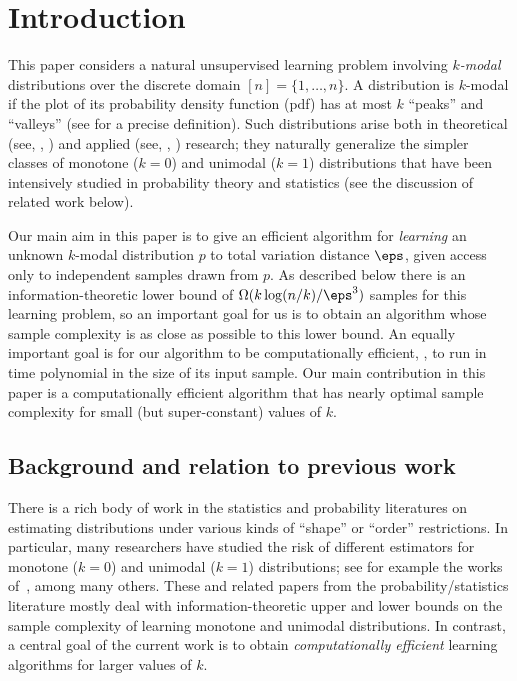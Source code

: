 \section{Introduction} \label{sec:intro}

%

This paper considers a natural unsupervised learning problem involving \emph{$k$-modal} distributions
  over the discrete domain $ {[n]=}\{1,\dots,n\}$. A distribution is
$k$-modal if the plot of its probability density function (pdf) has at most $k$ ``peaks''
and ``valleys'' (see  for a precise definition).  Such distributions arise both in theoretical (see, \eg, \cite{CKC:83,Kemperman:91,ChanTong:04}) and applied (see, \eg, \cite{Murphy:64,ToledoFernandez:90,FPPRD:98}) research; they naturally generalize the simpler classes of monotone ($k=0$) and unimodal ($k=1$) distributions
that have been intensively studied in probability theory and statistics (see the discussion of related work below).

Our main aim in this paper is to give an efficient algorithm for \emph{learning}
an unknown $k$-modal distribution $p$ to total variation distance $\eps$, given access only to independent samples drawn from $p$.  As described below there is an information-theoretic lower bound of
$\Omega(k \log(n/k)/\eps^3)$ samples for this learning problem, so an important goal for us is to
 obtain an algorithm whose sample complexity is as close as possible to this lower bound.  An equally important goal is for our
algorithm to be computationally efficient, \ie, to run in time 
polynomial in the size of its input sample.  
Our main contribution in this paper is a computationally efficient
algorithm that has nearly optimal sample complexity for 
small (but super-constant) values of $k$.


\subsection{Background and  relation to previous work} \label{sec:background}

%

There is a rich body of work in the statistics and probability literatures 
on estimating distributions under various kinds of ``shape'' or ``order'' 
restrictions.  In particular, many researchers have studied the risk of 
different estimators for monotone  {($k=0$)} 
and unimodal  {($k=1$)} distributions; see for 
example the works of~\cite{PrakasaRao:69,Wegman:70,Groeneboom:85,Birge:87, 
Birge:87b, Birge:97}, among many others.
These and related papers from the probability/statistics literature 
mostly deal with information-theoretic
upper and lower bounds on the sample complexity of learning 
monotone and unimodal distributions.  
 {In contrast, a central goal of the current work is to 
obtain \emph{computationally efficient} learning algorithms for
larger values of $k$.} 

